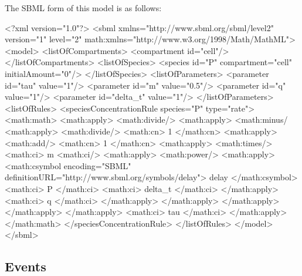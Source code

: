 \documentclass[10pt]{cekarticle}
\begin{document}
The SBML form of this model is as follows:
\begin{example}
<?xml version="1.0"?>
<sbml xmlns="http://www.sbml.org/sbml/level2" version="1" level="2"
      math:xmlns="http://www.w3.org/1998/Math/MathML">
    <model>
        <listOfCompartments>
            <compartment id="cell"/>
        </listOfCompartments>
        <listOfSpecies>
            <species id="P" compartment="cell" initialAmount="0"/>
        </listOfSpecies>
        <listOfParameters>
            <parameter id="tau" value="1"/>
            <parameter id="m" value="0.5"/>
            <parameter id="q" value="1"/>
            <parameter id="delta_t" value="1"/>
        </listOfParameters>
        <listOfRules>
            <speciesConcentrationRule species="P" type="rate">
                <math:math>
                 <math:apply>
                  <math:divide/>
                  <math:apply>
                   <math:minus/
                   <math:apply>
                    <math:divide/>
                    <math:cn> 1 </math:cn>
                    <math:apply>
                     <math:add/>
                     <math:cn> 1 </math:cn>
                     <math:apply>
                      <math:times/>
                      <math:ci> m <math:ci/>
                      <math:apply>
                       <math:power/>
                       <math:apply>
                        <math:csymbol encoding="SBML"
    definitionURL="http://www.sbml.org/symbols/delay">
                            delay
                        </math:csymbol>
                        <math:ci> P </math:ci>
                        <math:ci> delta_t </math:ci>
                       </math:apply>
                       <math:ci> q </math:ci>
                      </math:apply>
                     </math:apply>
                    </math:apply>
                   </math:apply>
                  </math:apply>
                  <math:ci> tau </math:ci>
                 </math:apply>
                </math:math>
            </speciesConcentrationRule>
        </listOfRules>
    </model>
</sbml>
\end{example}

\subsection{Events}
\label{sec:events}
\end{document}
